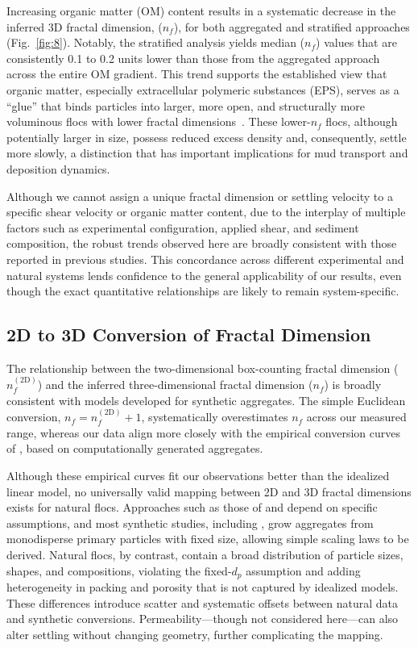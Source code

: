 \documentclass{agujournal2019}
\begin{document}
Increasing organic matter (OM) content results in a systematic decrease in the inferred 3D fractal dimension, (\(n_f\)), for both aggregated and stratified approaches (Fig.~\ref{fig:8}). Notably, the stratified analysis yields median (\(n_f\)) values that are consistently 0.1 to 0.2 units lower than those from the aggregated approach across the entire OM gradient. This trend supports the established view that organic matter, especially extracellular polymeric substances (EPS), serves as a ``glue'' that binds particles into larger, more open, and structurally more voluminous flocs with lower fractal dimensions~\cite{nghiem2022mechanistic}. These lower-$n_f$ flocs, although potentially larger in size, possess reduced excess density and, consequently, settle more slowly, a distinction that has important implications for mud transport and deposition dynamics.

Although we cannot assign a unique fractal dimension or settling velocity to a specific shear velocity or organic matter content, due to the interplay of multiple factors such as experimental configuration, applied shear, and sediment composition, the robust trends observed here are broadly consistent with those reported in previous studies. This concordance across different experimental and natural systems lends confidence to the general applicability of our results, even though the exact quantitative relationships are likely to remain system-specific.
\subsection{2D to 3D Conversion of Fractal Dimension}

The relationship between the two-dimensional box-counting fractal dimension (\(n_f^{(2\mathrm{D})}\)) and the inferred three-dimensional fractal dimension (\(n_f\)) is broadly consistent with models developed for synthetic aggregates. The simple Euclidean conversion, \(n_f = n_f^{(2\mathrm{D})} + 1\), systematically overestimates \(n_f\) across our measured range, whereas our data align more closely with the empirical conversion curves of , based on computationally generated aggregates.

Although these empirical curves fit our observations better than the idealized linear model, no universally valid mapping between 2D and 3D fractal dimensions exists for natural flocs. Approaches such as those of  and  depend on specific assumptions, and most synthetic studies, including , grow aggregates from monodisperse primary particles with fixed size, allowing simple scaling laws to be derived. Natural flocs, by contrast, contain a broad distribution of particle sizes, shapes, and compositions, violating the fixed-\(d_p\) assumption and adding heterogeneity in packing and porosity that is not captured by idealized models. These differences introduce scatter and systematic offsets between natural data and synthetic conversions. Permeability—though not considered here—can also alter settling without changing geometry, further complicating the mapping.
\end{document}
